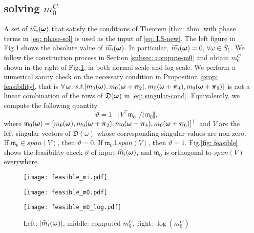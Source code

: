 \subsection{solving $m_0^C$}
A set of $\widetilde{m_{i}}(\boldsymbol{\omega})$ that satisfy the conditions of Theorem \ref{thm: thm} with phase terms in \eqref{eq: phase-sol} is used as the input of \eqref{eq: LS-new}.
The left figure in Fig.\ref{fig: tm_i_m_0} shows the absolute value of $\widetilde{m_{i}}(\boldsymbol{\omega})$. In particular, $\widetilde{m_{i}}(\boldsymbol{\omega}) =0,\,\forall \omega\in S_1$. 
We follow the construction process in Section \ref{subsec: compute-m0} and obtain $m_0^C$ shown in the right of Fig.\ref{fig: tm_i_m_0}, in both normal scale and log scale.  
We perform a numerical sanity check on the necessary condition in Proposition \ref{prop: feasibility}, that is $\forall\,\boldsymbol{\omega}, \,s.t. [m_0(\boldsymbol{\omega}), m_0(\boldsymbol{\omega}+\boldsymbol{\pi}_2),m_0(\boldsymbol{\omega}+\boldsymbol{\pi}_4),m_0(\boldsymbol{\omega}+\boldsymbol{\pi}_6)]$ is not a linear combination of the rows of $\mathfrak{D}(\boldsymbol{\omega})$ in \eqref{eq: singular-cond}. Equivalently, we compute the following quantity $$\vartheta = 1 - \Vert V^\top\mathfrak{m}_0 \Vert/\Vert \mathfrak{m}_0\Vert ,$$ where $\mathfrak{m}_0(\boldsymbol{\omega})=[m_0(\boldsymbol{\omega}), m_0(\boldsymbol{\omega}+\boldsymbol{\pi}_2),m_0(\boldsymbol{\omega}+\boldsymbol{\pi}_4),m_0(\boldsymbol{\omega}+\boldsymbol{\pi}_6)]^\top$ and $V$ are the left singular vectors of $\mathfrak{D}(\omega)$ whose corresponding singular values are non-zero. If $\mathfrak{m}_0\in span(V)$, then $\vartheta = 0$. If $\mathfrak{m}_0\bot span(V)$, then $\vartheta = 1$.
Fig.\ref{fig: feasible} shows the feasibility check $\vartheta$ of input $\widetilde{m_{i}}(\boldsymbol{\omega})$, and $\mathfrak{m}_0$ is orthogonal to $span(V)$ everywhere.

\begin{figure}
\centering
\begin{minipage}[c]{.48\textwidth}
\texttt{[image: feasible\_mi.pdf]}
\end{minipage}
\begin{minipage}[c]{.22\textwidth}
\centering
\texttt{[image: feasible\_m0.pdf]}
\end{minipage}
\begin{minipage}[c]{.28\textwidth}
\centering
\texttt{[image: feasible\_m0\_log.pdf]}
\end{minipage}
\caption{Left:  $|\widetilde{m_{i}}(\boldsymbol{\omega})|$, middle: computed $m_0^C$, right: $\log(m_0^C)$}
\label{fig: tm_i_m_0}
\end{figure}


